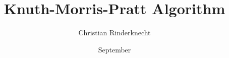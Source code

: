 \documentclass[compress,dvips,xcolor={dvipsnames},t]{beamer}
\title{\LARGE Knuth-Morris-Pratt Algorithm}
\author{Christian Rinderknecht}
\institute{Eszterházy Károly Katolikus Egyetem}
\date{September \oldstylenums{2026}}
\begin{document}
\frame{\maketitle}





\end{document}

